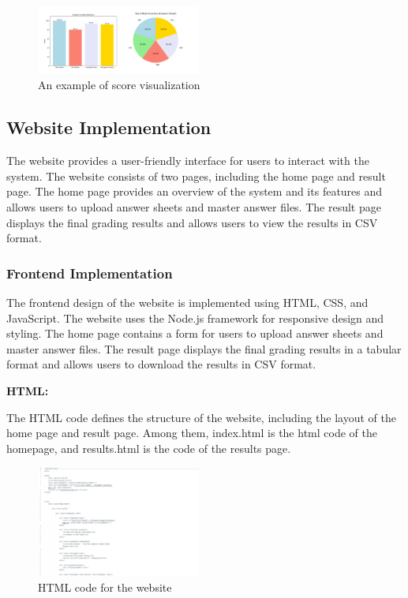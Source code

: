 \documentclass[twocolumn]{article}
\begin{document}
        \begin{figure}[ht]
            \centering
            \includegraphics[width=0.48\textwidth]{score_visualize.png}
            \caption{An example of score visualization}
            \label{fig:score_visualize} 
        \end{figure}



        \subsection{Website Implementation}

        The website provides a user-friendly interface for users to interact with the system. The website consists of two pages, including the home page and result page. The home page provides an overview of the system and its features and allows users to upload answer sheets and master answer files. The result page displays the final grading results and allows users to view the results in CSV format.

        \subsubsection{Frontend Implementation}

        The frontend design of the website is implemented using HTML, CSS, and JavaScript. The website uses the Node.js framework for responsive design and styling. The home page contains a form for users to upload answer sheets and master answer files. The result page displays the final grading results in a tabular format and allows users to download the results in CSV format.

        \textbf{HTML:} 
        
        The HTML code defines the structure of the website, including the layout of the home page and result page. Among them, index.html is the html code of the homepage, and results.html is the code of the results page.

        \begin{figure}[ht]
            \centering
            \includegraphics[width=0.48\textwidth]{html_preview.png}
            \caption{HTML code for the website}
            \label{fig:html_preview}
        \end{figure}
\end{document}
